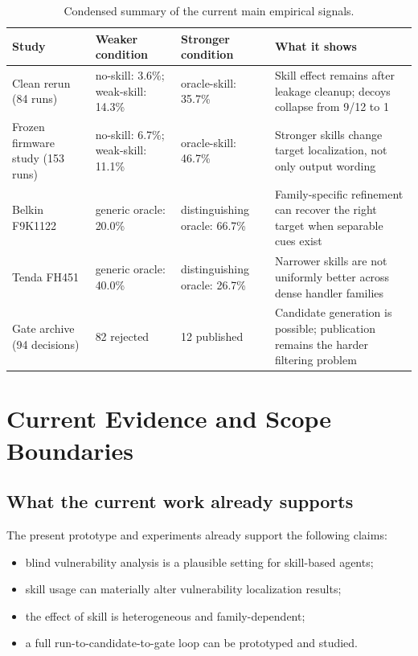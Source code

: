 \documentclass[11pt]{article}
\begin{document}
\begin{table}[t]
\centering
\caption{Condensed summary of the current main empirical signals.}
\label{tab:arxiv_main_results}
\footnotesize
\begin{tabular}{p{} p{} p{} p{}}
\toprule
Study & Weaker condition & Stronger condition & What it shows \\
\midrule
Clean rerun (84 runs) & no-skill: 3.6\%; weak-skill: 14.3\% & oracle-skill: 35.7\% & Skill effect remains after leakage cleanup; decoys collapse from 9/12 to 1 \\
Frozen firmware study (153 runs) & no-skill: 6.7\%; weak-skill: 11.1\% & oracle-skill: 46.7\% & Stronger skills change target localization, not only output wording \\
Belkin F9K1122 & generic oracle: 20.0\% & distinguishing oracle: 66.7\% & Family-specific refinement can recover the right target when separable cues exist \\
Tenda FH451 & generic oracle: 40.0\% & distinguishing oracle: 26.7\% & Narrower skills are not uniformly better across dense handler families \\
Gate archive (94 decisions) & 82 rejected & 12 published & Candidate generation is possible; publication remains the harder filtering problem \\
\bottomrule
\end{tabular}
\end{table}

\section{Current Evidence and Scope Boundaries}
\label{sec:status}

\subsection{What the current work already supports}

The present prototype and experiments already support the following claims:
\begin{itemize}[leftmargin=*]
    \item blind vulnerability analysis is a plausible setting for skill-based agents;
    \item skill usage can materially alter vulnerability localization results;
    \item the effect of skill is heterogeneous and family-dependent;
    \item a full run-to-candidate-to-gate loop can be prototyped and studied.
\end{itemize}
\end{document}
